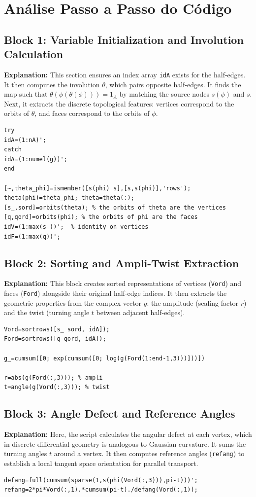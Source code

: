 \section*{Análise Passo a Passo do Código}

\subsection*{Block 1: Variable Initialization and Involution Calculation}
\textbf{Explanation:} This section ensures an index array \texttt{idA} exists for the half-edges. It then computes the involution $\theta$, which pairs opposite half-edges. It finds the map such that $\theta(\phi(\theta(\phi))) = 1_A$ by matching the source nodes $s(\phi)$ and $s$. Next, it extracts the discrete topological features: vertices correspond to the orbits of $\theta$, and faces correspond to the orbits of $\phi$.
\begin{lstlisting}
try
idA=(1:nA)';
catch
idA=(1:numel(g))';
end

[~,theta_phi]=ismember([s(phi) s],[s,s(phi)],'rows');
theta(phi)=theta_phi; theta=theta(:);
[s_,sord]=orbits(theta); % the orbits of theta are the vertices
[q,qord]=orbits(phi); % the orbits of phi are the faces
idV=(1:max(s_))';  % identity on vertices
idF=(1:max(q))';
\end{lstlisting}

\subsection*{Block 2: Sorting and Ampli-Twist Extraction}
\textbf{Explanation:} This block creates sorted representations of vertices (\texttt{Vord}) and faces (\texttt{Ford}) alongside their original half-edge indices. It then extracts the geometric properties from the complex vector $g$: the amplitude (scaling factor $r$) and the twist (turning angle $t$ between adjacent half-edges). 
\begin{lstlisting}
Vord=sortrows([s_ sord, idA]);
Ford=sortrows([q qord, idA]);

g_=cumsum([0; exp(cumsum([0; log(g(Ford(1:end-1,3)))]))])

r=abs(g(Ford(:,3))); % ampli
t=angle(g(Vord(:,3))); % twist
\end{lstlisting}

\subsection*{Block 3: Angle Defect and Reference Angles}
\textbf{Explanation:} Here, the script calculates the angular defect at each vertex, which in discrete differential geometry is analogous to Gaussian curvature. It sums the turning angles $t$ around a vertex. It then computes reference angles (\texttt{refang}) to establish a local tangent space orientation for parallel transport.
\begin{lstlisting}
defang=full(cumsum(sparse(1,s(phi(Vord(:,3))),pi-t)))';
refang=2*pi*Vord(:,1).*cumsum(pi-t)./defang(Vord(:,1));
\end{lstlisting}

